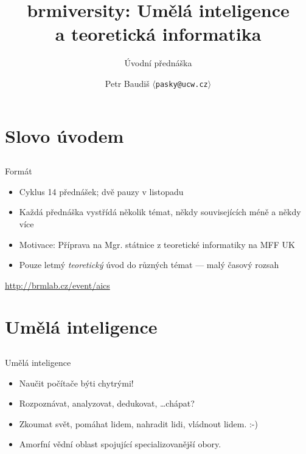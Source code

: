 \documentclass{beamer}
\begin{document}

\title{brmiversity: Umělá inteligence\\a teoretická informatika}
\subtitle{Úvodní přednáška}
\author{Petr Baudiš $\langle${\tt pasky@ucw.cz}$\rangle$}
\date{}
\frame{\titlepage}

\section{Slovo úvodem}

\subsection{}
\begin{frame}{Formát}
\begin{itemize}
\item Cyklus 14 přednášek; dvě pauzy v listopadu
\item Každá přednáška vystřídá několik témat, někdy souvisejících méně a někdy více
\item Motivace: Příprava na Mgr. státnice z teoretické informatiky na MFF UK
\item Pouze letmý {\em teoretický} úvod do různých témat --- malý časový rozsah
\end{itemize}
\begin{center}
\url{http://brmlab.cz/event/aics}
\end{center}
\end{frame}

\section{Umělá inteligence}

\subsection{}
\begin{frame}{Umělá inteligence}
\begin{itemize}
\item Naučit počítače býti chytrými!
\item Rozpoznávat, analyzovat, dedukovat, \dots chápat?
\item Zkoumat svět, pomáhat lidem, nahradit lidi, vládnout lidem. :-)
\item Amorfní vědní oblast spojující specializovanější obory.
\end{itemize}
\end{frame}
\end{document}
